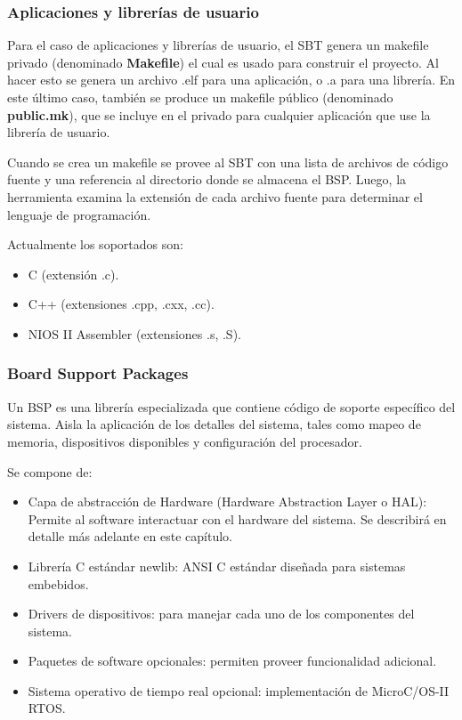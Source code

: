 \subsubsection*{Aplicaciones y librerías de usuario}

Para el caso de aplicaciones y librerías de usuario, el SBT genera un makefile privado (denominado \textbf{Makefile}) el cual es usado para construir el proyecto. Al hacer esto se genera un archivo .elf para una aplicación, o .a para una librería. En este último caso, también se produce un makefile público (denominado \textbf{public.mk}), que se incluye en el privado para cualquier aplicación que use la librería de usuario.

Cuando se crea un makefile se provee al SBT con una lista de archivos de código fuente y una referencia al directorio donde se almacena el BSP. Luego, la herramienta examina la extensión de cada archivo fuente para determinar el lenguaje de programación. 

Actualmente los soportados son:

\begin{itemize}
	\item C (extensión .c).
	\item C++ (extensiones .cpp, .cxx, .cc).
	\item NIOS II Assembler (extensiones .s, .S).
\end{itemize}


\subsubsection{Board Support Packages}

Un BSP es una librería especializada que contiene código de soporte específico del sistema. Aisla la aplicación de los detalles del sistema, tales como mapeo de memoria, dispositivos disponibles y configuración del procesador.

Se compone de:

\begin{itemize}
	\item Capa de abstracción de Hardware (Hardware Abstraction Layer o HAL): Permite al software interactuar con el hardware del sistema. Se describirá en detalle más adelante en este capítulo.
	\item Librería C estándar newlib: ANSI C estándar diseñada para sistemas embebidos.
	\item Drivers de dispositivos: para manejar cada uno de los componentes del sistema.
	\item Paquetes de software opcionales: permiten proveer funcionalidad adicional.
	\item Sistema operativo de tiempo real opcional: implementación de MicroC/OS-II RTOS.
\end{itemize}


